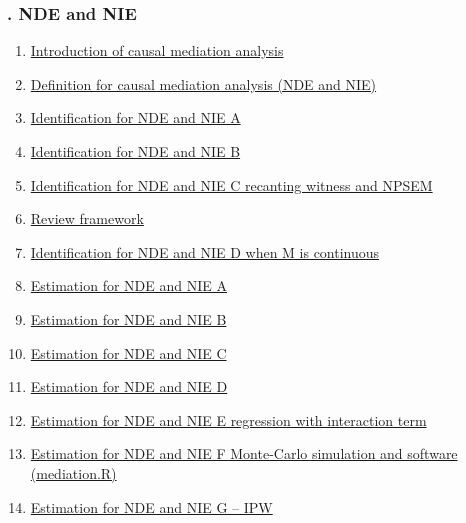 \documentclass[11pt]{article}
\begin{document}
\vspace{-1cm}

\subsubsection*{. NDE and NIE}

\vspace{-0.5cm}

\begin{enumerate}
	\item \href{https://mp.weixin.qq.com/s/Cw1v-UKBb9yigKF8q-yidg}{Introduction of causal mediation analysis}	%
	\item \href{https://mp.weixin.qq.com/s/F8WKmhrzXEyyiVd54RqZqA}{Definition for causal mediation analysis (NDE and NIE)}	%
	\item \href{https://mp.weixin.qq.com/s/DZnhE-gtiEh2iP0C9JmxeA}{Identification for NDE and NIE A}	%
	\item \href{https://mp.weixin.qq.com/s/oXRnkyD_0JK9tQuipgnOWw}{Identification for NDE and NIE B}	%
	\item \href{https://mp.weixin.qq.com/s/s5yrgAO913wcXmhOg-ysoQ}{Identification for NDE and NIE C recanting witness and NPSEM}	%
	\item \href{https://mp.weixin.qq.com/s/98U94FvD3D1oHK-HbdttPA}{Review framework}	%
	\item \href{https://mp.weixin.qq.com/s/UWTRO0gSPiswEDsIxtvPsA}{Identification for NDE and NIE D when M is continuous}	%
	\item \href{https://mp.weixin.qq.com/s/vBVU-ppWwzmZyUKgg0Kl4w}{Estimation for NDE and NIE A}	%
	\item \href{https://mp.weixin.qq.com/s/bt0p9SKevVP9M4avaJctPw}{Estimation for NDE and NIE B}	%
	\item \href{https://mp.weixin.qq.com/s/vAWnR_0fuI1AOJ0KQ_isTA}{Estimation for NDE and NIE C}	%
	\item \href{https://mp.weixin.qq.com/s/SnOdeYG1GWulNHkrp1feCQ}{Estimation for NDE and NIE D}	%
	\item \href{https://mp.weixin.qq.com/s/dEhVZrK9HF6A-c2Vxw5DTw}{Estimation for NDE and NIE E regression with interaction term}	%
	\item \href{https://mp.weixin.qq.com/s/Ryw632CtN_UNRRkzaYOXxw}{Estimation for NDE and NIE F Monte-Carlo simulation and software (mediation.R)}	%
	\item \href{https://mp.weixin.qq.com/s/-g18ym1rwA9dcfN4E0WEcg}{Estimation for NDE and NIE G – IPW}	%
\end{enumerate}
\end{document}
